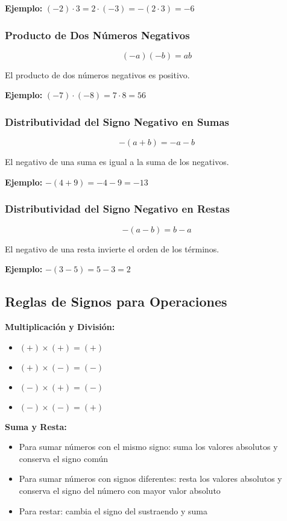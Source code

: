 \textbf{Ejemplo:} $(-2) \cdot 3 = 2 \cdot (-3) = -(2 \cdot 3) = -6$

\subsubsection{Producto de Dos Números Negativos}
$$(-a)(-b) = ab$$

El producto de dos números negativos es positivo.

\textbf{Ejemplo:} $(-7) \cdot (-8) = 7 \cdot 8 = 56$

\subsubsection{Distributividad del Signo Negativo en Sumas}
$$-(a + b) = -a - b$$

El negativo de una suma es igual a la suma de los negativos.

\textbf{Ejemplo:} $-(4 + 9) = -4 - 9 = -13$

\subsubsection{Distributividad del Signo Negativo en Restas}
$$-(a - b) = b - a$$

El negativo de una resta invierte el orden de los términos.

\textbf{Ejemplo:} $-(3 - 5) = 5 - 3 = 2$

\subsection{Reglas de Signos para Operaciones}

\textbf{Multiplicación y División:}
\begin{itemize}
    \item $(+) \times (+) = (+)$
    \item $(+) \times (-) = (-)$
    \item $(-) \times (+) = (-)$
    \item $(-) \times (-) = (+)$
\end{itemize}

\textbf{Suma y Resta:}
\begin{itemize}
    \item Para sumar números con el mismo signo: suma los valores absolutos y conserva el signo común
    \item Para sumar números con signos diferentes: resta los valores absolutos y conserva el signo del número con mayor valor absoluto
    \item Para restar: cambia el signo del sustraendo y suma
\end{itemize}

